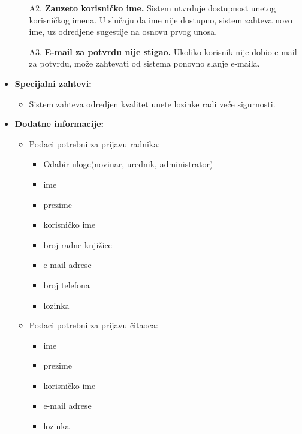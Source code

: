\documentclass{article}
\begin{document}
\begin{itemize}
\begin{itemize}
            \item[A2.] \textbf{Zauzeto korisničko ime.} Sistem utvrđuje dostupnost unetog korisničkog imena. U slučaju da ime nije dostupno, sistem zahteva novo ime, uz odredjene sugestije na osnovu prvog unosa.
            \item[A3.] \textbf{E-mail za potvrdu nije stigao.} Ukoliko korisnik nije dobio e-mail za potvrdu, može zahtevati od sistema ponovno slanje e-maila.
        \end{itemize}
    \item \textbf{Specijalni zahtevi:}
        \begin{itemize}
			\item Sistem zahteva odredjen kvalitet unete lozinke radi veće sigurnosti.
		\end{itemize}
	\item \textbf{Dodatne informacije:}
        \begin{itemize}
            \item  Podaci potrebni za prijavu radnika:
                \begin{itemize}
                    \item Odabir uloge(novinar, urednik, administrator)
                    \item ime
                    \item prezime
                    \item korisničko ime
                    \item broj radne knjižice
                    \item e-mail adrese
                    \item broj telefona
                    \item lozinka
                \end{itemize}
             \item  Podaci potrebni za prijavu čitaoca:
                \begin{itemize}
                    \item ime
                    \item prezime
                    \item korisničko ime
                    \item e-mail adrese
                    \item lozinka
                \end{itemize}
        \end{itemize}
\end{itemize}
\end{document}
